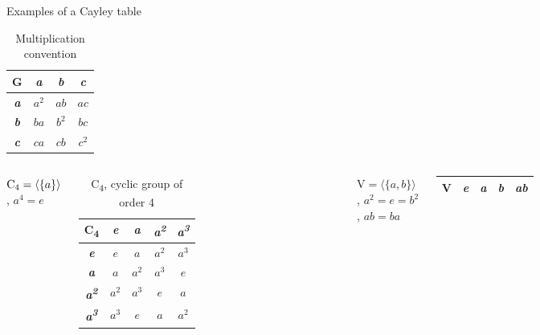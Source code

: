 \documentclass{beamer}
\begin{document}
\begin{frame}{Examples of a Cayley table}
    \centering
    \begin{table}[]
        \centering
        \setlength\extrarowheight{3pt}
        \begin{tabular}{|c|c|c|c|}
            \hline\textbf{G} & \textbf{\textit{a}} & \textbf{\textit{b}} & \textbf{\textit{c}} \\ \hline
            \textbf{\textit{a}} & $a^2$ & $ab$ & $ac$ \\ \hline
            \textbf{\textit{b}} & $ba$ & $b^2$ & $bc$ \\ \hline
            \textbf{\textit{c}} & $ca$ & $cb$ & $c^2$ \\ \hline
        \end{tabular}
        \caption{Multiplication convention}
    \end{table}
    \begin{columns}
        \centering
        $\text{C\textsubscript{4}}=\langle\{a\}\rangle$, $a^4=e$
        \begin{table}[]
            \centering
            \setlength\extrarowheight{3pt}
            \begin{tabular}{|c|c|c|c|c|}
                 \hline\textbf{C\textsubscript{4}} & \textbf{\textit{e}} & \textbf{\textit{a}} & \textbf{\textit{a\textsuperscript{2}}} & \textbf{\textit{a\textsuperscript{3}}} \\ \hline
                 \textbf{\textit{e}} & $e$ & $a$ & $a^2$ & $a^3$ \\ \hline
                 \textbf{\textit{a}} & $a$ & $a^2$ & $a^3$ & $e$\\ \hline
                 \textbf{\textit{a\textsuperscript{2}}} & $a^2$ & $a^3$ & $e$ & $a$ \\ \hline
                 \textbf{\textit{a\textsuperscript{3}}} & $a^3$ & $e$ & $a$ & $a^2$ \\\hline
            \end{tabular}
            \caption{C\textsubscript{4}, cyclic group of order 4}
        \end{table}
        \centering
        $\text{V}=\langle\{a,b\}\rangle$, $a^2=e=b^2$, $ab=ba$
        \begin{table}[]
        \centering
        \setlength\extrarowheight{3pt}
        \begin{tabular}{|c|c|c|c|c|}
            \hline\textbf{V} & \textbf{\textit{e}} & \textbf{\textit{a}} & \textbf{\textit{b}} & \textbf{\textit{ab}} \\ \hline

\end{tabular}
\end{table}
\end{columns}
\end{frame}
\end{document}
